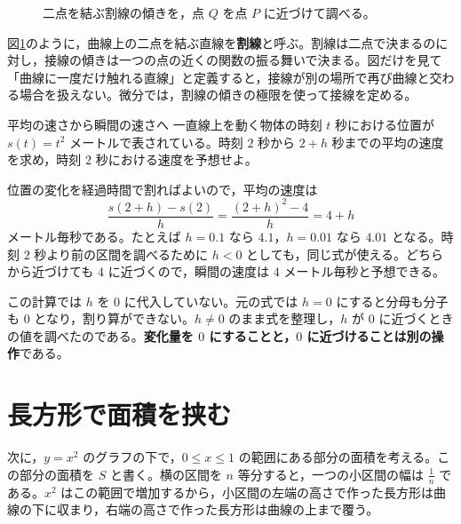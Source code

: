 \begin{figure}[htbp]
\centering
{}
\caption{二点を結ぶ割線の傾きを，点 $Q$ を点 $P$ に近づけて調べる。}
\label{図:導入接線}
\end{figure}

図\ref{図:導入接線}のように，曲線上の二点を結ぶ直線を\textbf{割線}と呼ぶ。割線は二点で決まるのに対し，接線の傾きは一つの点の近くの関数の振る舞いで決まる。図だけを見て「曲線に一度だけ触れる直線」と定義すると，接線が別の場所で再び曲線と交わる場合を扱えない。微分では，割線の傾きの極限を使って接線を定める。

\begin{example}{平均の速さから瞬間の速さへ}
一直線上を動く物体の時刻 $t$ 秒における位置が $s(t)=t^2$ メートルで表されている。時刻 $2$ 秒から $2+h$ 秒までの平均の速度を求め，時刻 $2$ 秒における速度を予想せよ。
\end{example}
位置の変化を経過時間で割ればよいので，平均の速度は
\[
 \frac{s(2+h)-s(2)}{h}
 =\frac{(2+h)^2-4}{h}=4+h
\]
メートル毎秒である。たとえば $h=0.1$ なら $4.1$，$h=0.01$ なら $4.01$ となる。時刻 $2$ 秒より前の区間を調べるために $h<0$ としても，同じ式が使える。どちらから近づけても $4$ に近づくので，瞬間の速度は $4$ メートル毎秒と予想できる。

この計算では $h$ を $0$ に代入していない。元の式では $h=0$ にすると分母も分子も $0$ となり，割り算ができない。$h\ne0$ のまま式を整理し，$h$ が $0$ に近づくときの値を調べたのである。\textbf{変化量を $0$ にすることと，$0$ に近づけることは別の操作}である。

\section{長方形で面積を挟む}\label{節:導入長方形}
次に，$y=x^2$ のグラフの下で，$0\le x\le1$ の範囲にある部分の面積を考える。この部分の面積を $S$ と書く。横の区間を $n$ 等分すると，一つの小区間の幅は $\frac1n$ である。$x^2$ はこの範囲で増加するから，小区間の左端の高さで作った長方形は曲線の下に収まり，右端の高さで作った長方形は曲線の上まで覆う。

